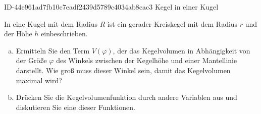 \begin{exercise}
      {ID-44e961ad7fb10c7eadf2439d5789c4034ab8cac3}
      {Kegel in einer Kugel}
  \ifproblem\problem
    \ifthenelse{\isundefined{\linecalc}}{\newlength{\linecalc}}{\relax}%
    \setlength{\linecalc}{\linewidth}%
    \addtolength{\linecalc}{-68mm}%
    \begin{minipage}[T]{\linecalc}
      In eine Kugel mit dem Radius $R$ ist ein gerader Kreiskegel mit dem Radius $r$
      und der Höhe $h$ einbeschrieben.
      \begin{enumerate}[a)]
        \item Ermitteln Sie den Term $V(\varphi)$, der das Kegelvolumen in
              Abhängigkeit von der Größe $\varphi$ des Winkels zwischen
              der Kegelhöhe und einer Mantellinie darstellt.
              Wie groß muss dieser Winkel sein, damit das Kegelvolumen
              maximal wird?
        \item Drücken Sie die Kegelvolumenfunktion durch andere Variablen aus
              und diskutieren Sie eine dieser Funktionen.
      \end{enumerate}
    \end{minipage}\hfill
    \begin{minipage}[T]{61mm}
      \raggedleft
    \end{minipage}
  \fi
\end{exercise}
